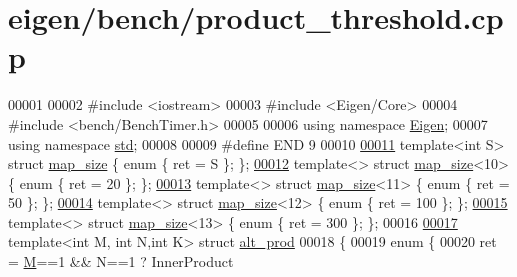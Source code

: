 \hypertarget{eigen_2bench_2product__threshold_8cpp_source}{}\section{eigen/bench/product\+\_\+threshold.cpp}
\label{eigen_2bench_2product__threshold_8cpp_source}

\begin{DoxyCode}
00001 
00002 \textcolor{preprocessor}{#include <iostream>}
00003 \textcolor{preprocessor}{#include <Eigen/Core>}
00004 \textcolor{preprocessor}{#include <bench/BenchTimer.h>}
00005 
00006 \textcolor{keyword}{using namespace }\hyperlink{namespace_eigen}{Eigen};
00007 \textcolor{keyword}{using namespace }\hyperlink{namespacestd}{std};
00008 
00009 \textcolor{preprocessor}{#define END 9}
00010 
\hyperlink{structmap__size}{00011} \textcolor{keyword}{template}<\textcolor{keywordtype}{int} S> \textcolor{keyword}{struct }\hyperlink{structmap__size}{map\_size} \{ \textcolor{keyword}{enum} \{ ret = S \}; \};
\hyperlink{structmap__size_3_0110_01_4}{00012} \textcolor{keyword}{template}<>  \textcolor{keyword}{struct }\hyperlink{structmap__size}{map\_size}<10> \{ \textcolor{keyword}{enum} \{ ret = 20 \}; \};
\hyperlink{structmap__size_3_0111_01_4}{00013} \textcolor{keyword}{template}<>  \textcolor{keyword}{struct }\hyperlink{structmap__size}{map\_size}<11> \{ \textcolor{keyword}{enum} \{ ret = 50 \}; \};
\hyperlink{structmap__size_3_0112_01_4}{00014} \textcolor{keyword}{template}<>  \textcolor{keyword}{struct }\hyperlink{structmap__size}{map\_size}<12> \{ \textcolor{keyword}{enum} \{ ret = 100 \}; \};
\hyperlink{structmap__size_3_0113_01_4}{00015} \textcolor{keyword}{template}<>  \textcolor{keyword}{struct }\hyperlink{structmap__size}{map\_size}<13> \{ \textcolor{keyword}{enum} \{ ret = 300 \}; \};
00016 
\hyperlink{structalt__prod}{00017} \textcolor{keyword}{template}<\textcolor{keywordtype}{int} M, \textcolor{keywordtype}{int} N,\textcolor{keywordtype}{int} K> \textcolor{keyword}{struct }\hyperlink{structalt__prod}{alt\_prod}
00018 \{
00019   \textcolor{keyword}{enum} \{
00020     ret = \hyperlink{group___core___module_class_eigen_1_1_matrix}{M}==1 && N==1 ? InnerProduct

\end{DoxyCode}
